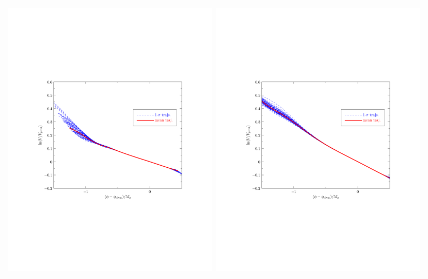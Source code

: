 \documentclass[11pt]{article}
\def \halffigwidth{0.48\textwidth}
\begin{document}
\begin{figure}
  \includegraphics[width=\halffigwidth,  trim = 1in 2.9in 1in 2.9in]{nobicep_spline0_p11_r0d2_potential_traj.pdf}
  \includegraphics[width=\halffigwidth,  trim = 1in 2.9in 1in 2.9in]{nobicep_spline0_p11_r0d5_potential_traj.pdf}%

\end{figure}
\end{document}
